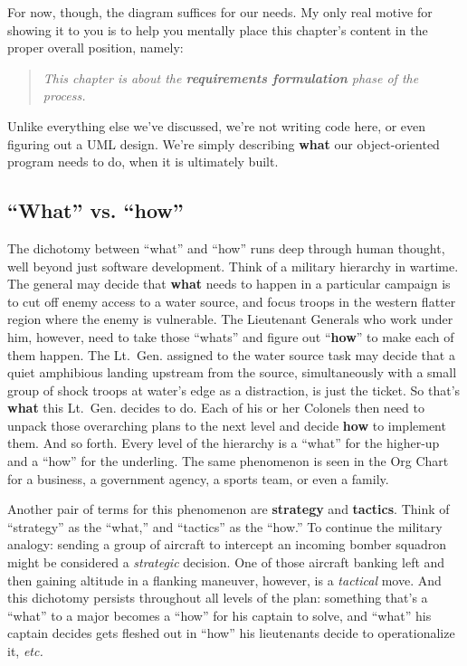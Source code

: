 For now, though, the diagram suffices for our needs. My only real motive for
showing it to you is to help you mentally place this chapter's content in the
proper overall position, namely:

\begin{quote}
\textit{This chapter is about the \textbf{requirements formulation} phase of
the process.}
\end{quote} 

Unlike everything else we've discussed, we're not writing code here, or even
figuring out a UML design. We're simply describing \textbf{what} our
object-oriented program needs to do, when it is ultimately built.

\subsection{``What'' vs. ``how''}

The dichotomy between ``what'' and ``how'' runs deep through human thought,
well beyond just software development. Think of a military hierarchy in
wartime. The general may decide that \textbf{what} needs to happen in a
particular campaign is to cut off enemy access to a water source, and focus
troops in the western flatter region where the enemy is vulnerable. The
Lieutenant Generals who work under him, however, need to take those ``whats''
and figure out ``\textbf{how}'' to make each of them happen. The Lt.~Gen.
assigned to the water source task may decide that a quiet amphibious landing
upstream from the source, simultaneously with a small group of shock troops at
water's edge as a distraction, is just the ticket. So that's \textbf{what}
this Lt.~Gen. decides to do. Each of his or her Colonels then need to unpack
those overarching plans to the next level and decide \textbf{how} to implement
them. And so forth. Every level of the hierarchy is a ``what'' for the
higher-up and a ``how'' for the underling. The same phenomenon is seen in the
Org Chart for a business, a government agency, a sports team, or even a
family.

Another pair of terms for this phenomenon are \textbf{strategy} and
\textbf{tactics}. Think of ``strategy'' as the ``what,'' and ``tactics'' as
the ``how.'' To continue the military analogy: sending a group of aircraft to
intercept an incoming bomber squadron might be considered a \textit{strategic}
decision. One of those aircraft banking left and then gaining altitude in a
flanking maneuver, however, is a \textit{tactical} move. And this dichotomy
persists throughout all levels of the plan: something that's a ``what'' to a
major becomes a ``how'' for his captain to solve, and ``what'' his captain
decides gets fleshed out in ``how'' his lieutenants decide to operationalize
it, \textit{etc.}

